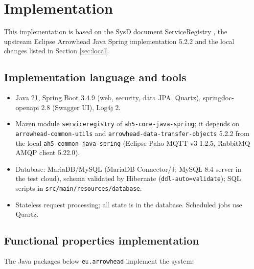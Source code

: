 \documentclass[a4paper]{arrowhead}
\begin{document}
\newpage

\section{Implementation}
\label{Implementation}

This implementation is based on the SysD document ServiceRegistry \cite{sr-sysd}, the upstream Eclipse Arrowhead Java Spring implementation 5.2.2 \cite{ah5java} and the local changes listed in Section \ref{sec:local}.

\subsection{Implementation language and tools}
\begin{itemize}
\item Java 21, Spring Boot 3.4.9 (web, security, data JPA, Quartz), springdoc-openapi 2.8 (Swagger UI), Log4j 2.
\item Maven module \texttt{serviceregistry} of \texttt{ah5-core-java-spring}; it depends on \texttt{arrowhead-common-utils} and \texttt{arrowhead-data-transfer-objects} 5.2.2 from the local \texttt{ah5-common-java-spring} (Eclipse Paho MQTT v3 1.2.5, RabbitMQ AMQP client 5.22.0).
\item Database: MariaDB/MySQL (MariaDB Connector/J; MySQL 8.4 server in the test cloud), schema validated by Hibernate (\texttt{ddl-auto=validate}); SQL scripts in \texttt{src/main/resources/database}.
\item Stateless request processing; all state is in the database. Scheduled jobs use Quartz.
\end{itemize}

\subsection{Functional properties implementation}

The Java packages below \texttt{eu.arrowhead} implement the system:
\end{document}
